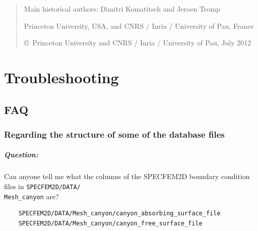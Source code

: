 \documentclass[oneside,english,onecolumn,letterpaper]{book}
\begin{document}

\begin{quote}
Main historical authors: Dimitri Komatitsch and Jeroen Tromp

Princeton University, USA,
and CNRS / Inria / University of Pau, France

\copyright\ Princeton University and CNRS / Inria / University of Pau, July 2012
\end{quote}






\appendix



\chapter{\label{cha:Troubleshooting}Troubleshooting}



\section*{FAQ}

\subsection*{Regarding the structure of some of the database files}

\paragraph{Question:} Can anyone tell me what the columns of the SPECFEM2D boundary
condition files in \texttt{SPECFEM2D/DATA/}~\\
\texttt{Mesh\_canyon} are?
%
\begin{verbatim}
    SPECFEM2D/DATA/Mesh_canyon/canyon_absorbing_surface_file
    SPECFEM2D/DATA/Mesh_canyon/canyon_free_surface_file
\end{verbatim}
\end{document}
